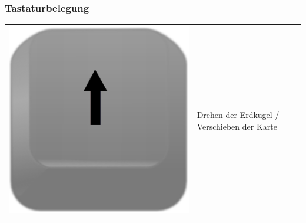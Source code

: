\documentclass[10pt]{scrreprt}
\begin{document}
\subsubsection*{Tastaturbelegung} 
\begin{tabular}{|>{\centering \arraybackslash}m{3cm}|m{10cm}|}
\hline
\rule[-1ex]{0pt}{7ex}\includegraphics[scale=0.08]{images/key_arrow_up.eps}& \multirow{3}{*}{Drehen der Erdkugel / Verschieben der Karte}\\

\end{tabular}
\end{document}
